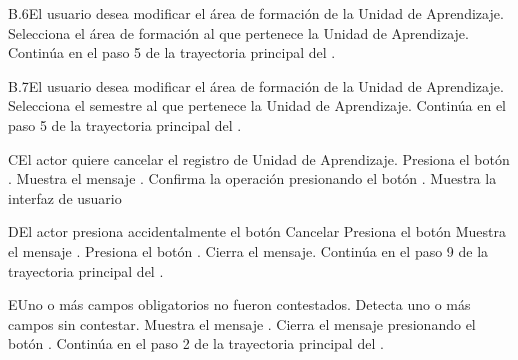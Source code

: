 
\begin{UCtrayectoriaA}{B.6}{El usuario desea modificar el área de formación de la Unidad de Aprendizaje.}
	\UCpaso[\UCactor] Selecciona el área de formación al que pertenece la Unidad de Aprendizaje.
	\UCpaso Continúa en el paso 5 de la trayectoria principal del .
\end{UCtrayectoriaA}



\begin{UCtrayectoriaA}{B.7}{El usuario desea modificar el área de formación de la Unidad de Aprendizaje.}
	\UCpaso[\UCactor] Selecciona el semestre al que pertenece la Unidad de Aprendizaje.
	\UCpaso Continúa en el paso 5 de la trayectoria principal del .
\end{UCtrayectoriaA}




\begin{UCtrayectoriaA}{C}{El actor quiere cancelar el registro de Unidad de Aprendizaje.}
	\UCpaso[\UCactor] Presiona el botón .
	\UCpaso Muestra el mensaje .
	\UCpaso[\UCactor] Confirma la operación presionando el botón .
	\UCpaso Muestra la interfaz de usuario 
\end{UCtrayectoriaA}




\begin{UCtrayectoriaA}{D}{El actor presiona accidentalmente el botón Cancelar}
	\UCpaso[\UCactor] Presiona el botón 
	\UCpaso Muestra el mensaje .
	\UCpaso[\UCactor] Presiona el botón .
	\UCpaso Cierra el mensaje.
	\UCpaso Continúa en el paso 9 de la trayectoria principal del .
\end{UCtrayectoriaA}




\begin{UCtrayectoriaA}{E}{Uno o más campos obligatorios no fueron contestados.}
	\UCpaso Detecta uno o más campos sin contestar.
	\UCpaso Muestra el mensaje .
	\UCpaso[\UCactor] Cierra el mensaje presionando el botón .
	\UCpaso Continúa en el paso 2 de la trayectoria principal del .
\end{UCtrayectoriaA}